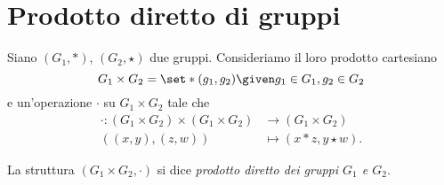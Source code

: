 \section{Prodotto diretto di gruppi}

\begin{definition}
    Siano $(G_1, \ast)$, $(G_2, \star)$ due gruppi. Consideriamo il loro prodotto cartesiano \[
        G_1 \times G_2 = \set*{(g_1, g_2) \given g_1 \in G_1, g_2 \in G_2}    
    \] e un'operazione $\cdot$ su $G_1 \times G_2$ tale che \begin{align*}
    \cdot : (G_1 \times G_2) \times (G_1 \times G_2) &\to (G_1 \times G_2)\\
    ((x, y), (z, w)) &\mapsto (x * z, y \star w).
    \end{align*}
    
    La struttura $(G_1 \times G_2, \cdot)$ si dice \emph{prodotto diretto dei gruppi $G_1$ e $G_2$}.
\end{definition}

